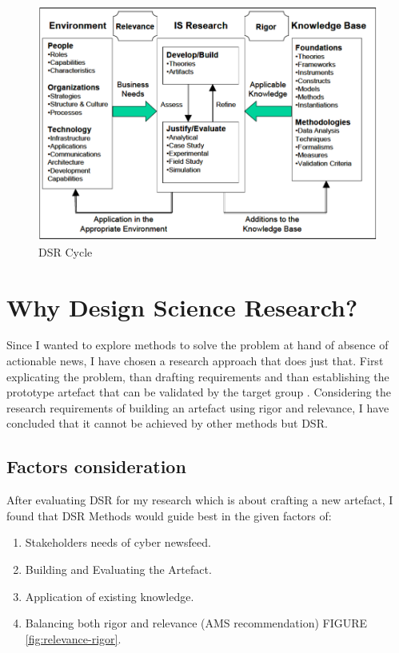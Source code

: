 \begin{figure}
\centering
    \includegraphics[scale=.75]{Figures/dsr.png}
    \caption{DSR  Cycle \citep[p. 80]{hevner2004design}}
    \label{fig:dsr }
\end{figure}

\section{Why Design Science Research?}
\label{Research Methodology: Design Science Research}

Since I wanted to explore methods to solve the problem at hand of absence of actionable news, 
I have chosen a research approach that does just that. First explicating the problem, 
than drafting requirements and than  establishing the prototype artefact that can be validated by the target group 
\citep{bobbert2018improving}.  
Considering the research requirements of building an artefact using rigor and relevance, 
I have concluded that it cannot be achieved  by  other methods but DSR.

\subsection{Factors consideration}

After evaluating DSR for my research which is about crafting a new artefact, 
I found that DSR Methods would guide best in the given factors of:

 \begin{enumerate}
     \item Stakeholders needs of cyber newsfeed.
     \item Building and Evaluating the Artefact.
     \item Application of existing knowledge.
     \item Balancing both rigor and relevance 
     (AMS recommendation)
     FIGURE \ref{fig:relevance-rigor}. 
 \end{enumerate}
 
